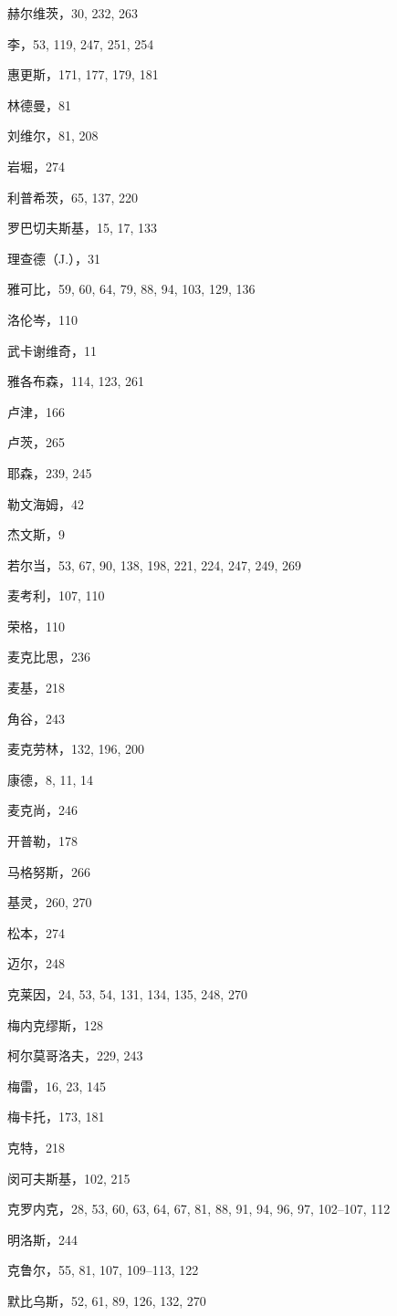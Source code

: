 赫尔维茨，30, 232, 263

李，53, 119, 247, 251, 254

惠更斯，171, 177, 179, 181

林德曼，81

刘维尔，81, 208

岩堀，274

利普希茨，65, 137, 220

罗巴切夫斯基，15, 17, 133

理查德（J.），31

雅可比，59, 60, 64, 79, 88, 94, 103, 129, 136

洛伦岑，110

武卡谢维奇，11

雅各布森，114, 123, 261

卢津，166

卢茨，265

耶森，239, 245

勒文海姆，42

杰文斯，9

若尔当，53, 67, 90, 138, 198, 221, 224, 247, 249, 269

麦考利，107, 110

荣格，110

麦克比思，236

麦基，218

角谷，243

麦克劳林，132, 196, 200

康德，8, 11, 14

麦克尚，246

开普勒，178

马格努斯，266

基灵，260, 270

松本，274

迈尔，248

克莱因，24, 53, 54, 131, 134, 135, 248, 270

梅内克缪斯，128

柯尔莫哥洛夫，229, 243

梅雷，16, 23, 145

梅卡托，173, 181

克特，218

闵可夫斯基，102, 215

克罗内克，28, 53, 60, 63, 64, 67, 81, 88, 91, 94, 96, 97, 102--107, 112

明洛斯，244

克鲁尔，55, 81, 107, 109--113, 122

默比乌斯，52, 61, 89, 126, 132, 270

